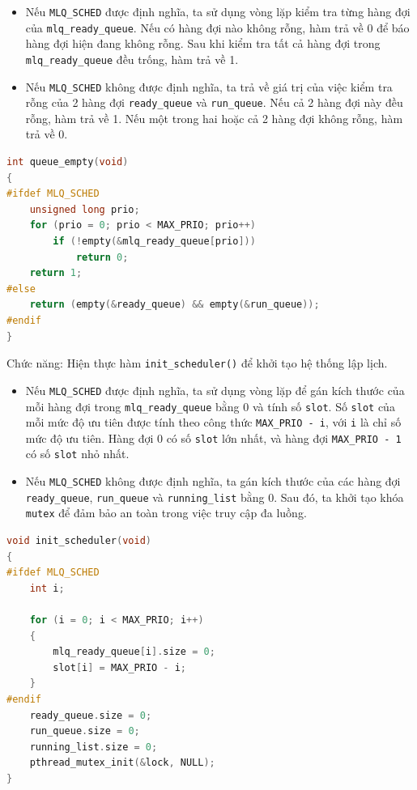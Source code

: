 \begin{itemize}
    \item Nếu \texttt{MLQ\_SCHED} được định nghĩa, ta sử dụng vòng lặp kiểm tra từng hàng đợi của \texttt{mlq\_ready\_queue}. Nếu có hàng đợi nào không rỗng, hàm trả về 0 để báo hàng đợi hiện đang không rỗng. Sau khi kiểm tra tất cả hàng đợi trong \texttt{mlq\_ready\_queue} đều trống, hàm trả về 1.
    \item Nếu \texttt{MLQ\_SCHED} không được định nghĩa, ta trả về giá trị của việc kiểm tra rỗng của 2 hàng đợi \texttt{ready\_queue} và \texttt{run\_queue}. Nếu cả 2 hàng đợi này đều rỗng, hàm trả về 1. Nếu một trong hai hoặc cả 2 hàng đợi không rỗng, hàm trả về 0.
\end{itemize}

\begin{lstlisting}[style=Cstyle,language=C]
int queue_empty(void)
{
#ifdef MLQ_SCHED
    unsigned long prio;
    for (prio = 0; prio < MAX_PRIO; prio++)
        if (!empty(&mlq_ready_queue[prio]))
            return 0;
    return 1;
#else
    return (empty(&ready_queue) && empty(&run_queue));
#endif
}
\end{lstlisting}




Chức năng: Hiện thực hàm \texttt{init\_scheduler()} để khởi tạo hệ thống lập lịch.

\begin{itemize}
    \item Nếu \texttt{MLQ\_SCHED} được định nghĩa, ta sử dụng vòng lặp để gán kích thước của mỗi hàng đợi trong \texttt{mlq\_ready\_queue} bằng 0 và tính số \texttt{slot}. Số \texttt{slot} của mỗi mức độ ưu tiên được tính theo công thức \texttt{MAX\_PRIO - i}, với \texttt{i} là chỉ số mức độ ưu tiên. Hàng đợi 0 có số \texttt{slot} lớn nhất, và hàng đợi \texttt{MAX\_PRIO - 1} có số \texttt{slot} nhỏ nhất.
    \item Nếu \texttt{MLQ\_SCHED} không được định nghĩa, ta gán kích thước của các hàng đợi \texttt{ready\_queue}, \texttt{run\_queue} và \texttt{running\_list} bằng 0. Sau đó, ta khởi tạo khóa \texttt{mutex} để đảm bảo an toàn trong việc truy cập đa luồng.
\end{itemize}

\begin{lstlisting}[style=Cstyle,language=C]
void init_scheduler(void)
{
#ifdef MLQ_SCHED
    int i;

    for (i = 0; i < MAX_PRIO; i++)
    {
        mlq_ready_queue[i].size = 0;
        slot[i] = MAX_PRIO - i;
    }
#endif
    ready_queue.size = 0;
    run_queue.size = 0;
    running_list.size = 0;
    pthread_mutex_init(&lock, NULL);
}
\end{lstlisting}


